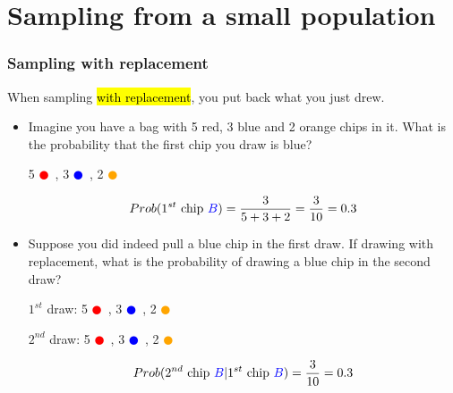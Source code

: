 \documentclass[notes,11pt, aspectratio=169]{beamer}
\begin{document}

\section{Sampling from a small population}


\begin{frame}
\frametitle{Sampling with replacement}

When sampling \hl{with replacement}, you put back what you just drew.

\pause

\begin{itemize}

\item Imagine you have a bag with 5 red, 3 blue and 2 orange chips in it. What is the probability that the first chip you draw is blue?
\begin{center}
5 \textcolor{red}{$\CIRCLE$}~, 3 \textcolor{blue}{$\CIRCLE$}~, 2 \textcolor{orange}{$\CIRCLE$}
\end{center}

\pause

\[ Prob(1^{st} \text{ chip } \textcolor{blue}{B}) = \frac{3}{5 + 3 + 2} = \frac{3}{10} = 0.3 \]

\pause

\item Suppose you did indeed pull a blue chip in the first draw. If drawing with replacement, what is the probability of drawing a blue chip in the second draw?

\pause

\begin{center}
$1^{st}$ draw: 5 \textcolor{red}{$\CIRCLE$}~, 3 \textcolor{blue}{$\CIRCLE$}~, 2 \textcolor{orange}{$\CIRCLE$} \\

\pause

$2^{nd}$ draw: 5 \textcolor{red}{$\CIRCLE$}~, 3 \textcolor{blue}{$\CIRCLE$}~, 2 \textcolor{orange}{$\CIRCLE$}
\end{center}

\pause

\[ Prob(2^{nd} \text{ chip } \textcolor{blue}{B} | 1^{st} \text{ chip } \textcolor{blue}{B}) = \frac{3}{10} = 0.3 \]

\end{itemize}

\end{frame}
\end{document}
